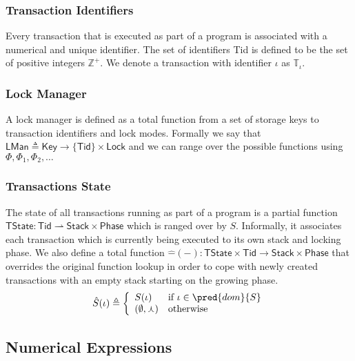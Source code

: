 \subsubsection{Transaction Identifiers}

Every transaction that is executed as part of a program is associated with a numerical and unique identifier. The set of identifiers \textsf{Tid} is defined to be the set of positive integers $\mathds{Z}^+$. We denote a transaction with identifier $\iota$ as $\mathds{T}_\iota$.

\subsubsection{Lock Manager}

A lock manager is defined as a total function from a set of storage keys to transaction identifiers and lock modes. Formally we say that $\mathsf{LMan} \triangleq \mathsf{Key} \rightarrow \{ \mathsf{Tid} \} \times \mathsf{Lock}$ and we can range over the possible functions using $\Phi, \Phi_1, \Phi_2, \ldots$

\subsubsection{Transactions State}

The state of all transactions running as part of a program is a partial function $\mathsf{TState} : \mathsf{Tid} \rightharpoonup \mathsf{Stack} \times \mathsf{Phase}$ which is ranged over by $S$. Informally, it associates each transaction which is currently being executed to its own stack and locking phase. We also define a total function $\hat{-}(-) : \mathsf{TState} \times \mathsf{Tid} \rightarrow \mathsf{Stack} \times \mathsf{Phase}$ that overrides the original function lookup in order to cope with newly created transactions with an empty stack starting on the growing phase.
\[
\hat{S}(\iota) \triangleq \bigg\{ \begin{array}{l l}
S(\iota) & \text{if } \iota \in \pred{dom}{S} \\
(\emptyset, \curlywedge) & \text{otherwise}
\end{array}
\]

\subsection{Numerical Expressions}

